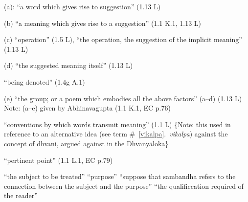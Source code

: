 \documentclass[10pt]{article}
\begin{document}
\begin{multicols}{2}
\begin{enumerate}[
			leftmargin=0em,
			rightmargin=0em,
		]
		 (a): ``a word which gives rise to suggestion'' (1.13 L)

		 (b) ``a meaning which gives rise to a suggestion'' (1.1 K.1, 1.13 L)%

		 (c) ``operation'' (1.5 L),
		``the operation, the suggestion of the implicit meaning'' (1.13 L)

		 (d) ``the suggested meaning itself'' (1.13 L)

		 ``being denoted'' (1.4g A.1)

		 (e) ``the group; or a poem which embodies all the above factors'' (a--d) (1.13 L) Note: (a--e) given by Abhinavagupta (1.1 K.1, EC p.76)

		  ``conventions by which words transmit meaning'' (1.1 L) \{Note: this used in reference to an alternative idea (see term \#~\ref{vikalpa}.\ \textit{vikalpa}) against the concept of dhvani, argued against in the Dhvanyāloka\}

		 ``pertinent point'' (1.1 L.1, EC p.79)
		\begin{enumerate}
			 ``the subject to be treated''
			 ``purpose''
			 ``suppose that sambandha refers to the connection between the subject and the purpose''
			 ``the qualificcation required of the reader''
		\end{enumerate}


\end{enumerate}
\end{multicols}
\end{document}
